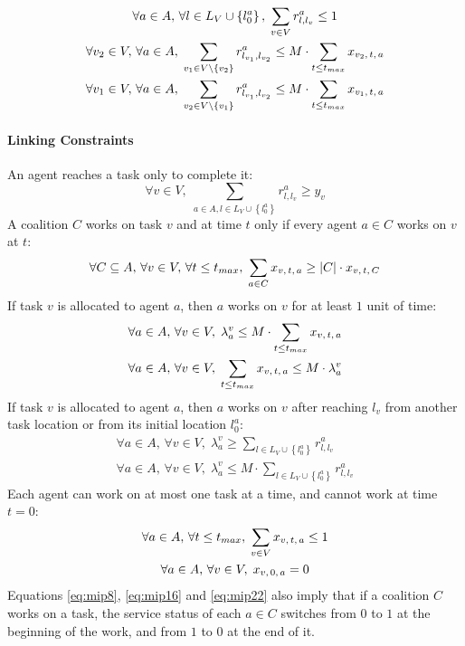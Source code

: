 \begin{gather}
    \forall a \in A,\, \forall l \in L_V \cup \left\{ l^a_0 \right\},\;
    \sum_{v \in V} r^a_{l, l_v} \leq 1\label{eq:mip12}\\
    \forall v_2 \in V,\, \forall a \in A,\;
    \sum_{v_1 \in V \setminus \{ v_2 \}} r^a_{l_{v_1}, l_{v_2}} \leq M \cdot \sum_{t \leq
    t_{max}} x_{v_2,\, t,\, a}\label{eq:mip13}\\
    \forall v_1 \in V,\, \forall a \in A,\;
    \sum_{v_2 \in V \setminus \{ v_1 \}} r^a_{l_{v_1}, l_{v_2}} \leq M \cdot \sum_{t \leq
    t_{max}} x_{v_1,\, t,\, a}\label{eq:mip14}
\end{gather}

\paragraph{Linking Constraints}
An agent reaches a task only to complete it:
\begin{equation}\label{eq:mip15}
    \forall v \in V,\;
    \sum_{a \in A, l \in L_V \cup \left\{ l^a_0 \right\}} r^a_{l, l_v} \geq y_v
\end{equation}
A coalition $C$ works on task $v$ and at time $t$ only if every agent $a \in C$ works on
$v$ at $t$:
\begin{equation}\label{eq:mip16}
    \forall C \subseteq A,\, \forall v \in V,\, \forall t \leq t_{max},\;
    \sum_{a \in C} x_{v,\, t,\, a} \geq |C| \cdot x_{v,\, t,\, C}
\end{equation}
If task $v$ is allocated to agent $a$, then $a$ works on $v$ for at least $1$ unit of
time:
\begin{gather}
    \forall a \in A,\, \forall v \in V,\;
    \lambda^v_a \leq M \cdot \sum_{t \leq t_{max}} x_{v,\, t,\, a}\label{eq:mip17}\\
    \forall a \in A,\, \forall v \in V,\;
    \sum_{t \leq t_{max}} x_{v,\, t,\, a} \leq M \cdot \lambda^v_a\label{eq:mip18}
\end{gather}
If task $v$ is allocated to agent $a$, then $a$ works on $v$ after reaching $l_v$ from
another task location or from its initial location $l^a_0$:
\begin{gather}
    \forall a \in A,\, \forall v \in V,\;
    \lambda^v_a \geq \sum_{l \in L_V \cup \left\{ l^a_0 \right\}} r^a_{l,
    l_v}\label{eq:mip19}\\
    \forall a \in A,\, \forall v \in V,\;
    \lambda^v_a \leq M \cdot \sum_{l \in L_V \cup \left\{ l^a_0 \right\}} r^a_{l,
    l_v}\label{eq:mip20}
\end{gather}
Each agent can work on at most one task at a time, and cannot work at time $t = 0$:
\begin{gather}
    \forall a \in A,\, \forall t \leq t_{max},\; \sum_{v \in V} x_{v,\, t,\, a} \leq 1\label{eq:mip21}\\
    \forall a \in A,\, \forall v \in V,\; x_{v,\, 0,\, a} = 0\label{eq:mip22}
\end{gather}
Equations \ref{eq:mip8}, \ref{eq:mip16} and \ref{eq:mip22} also imply that if a coalition
$C$ works on a task, the service status of each $a \in C$ switches from $0$ to $1$ at the
beginning of the work, and from $1$ to $0$ at the end of it.


